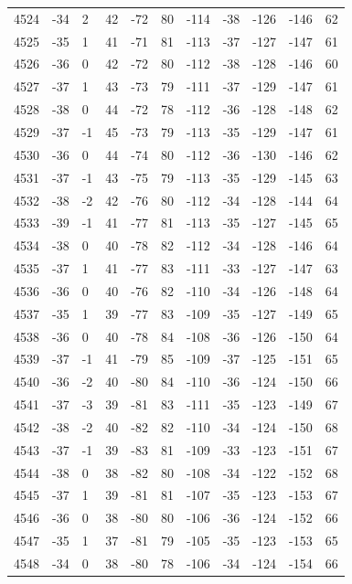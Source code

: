 \begin{table}[H]
\begin{tabular}{lllllllllll}
4524 & -34 & 2 & 42 & -72 & 80 & -114 & -38 & -126 & -146 & 62 \\
4525 & -35 & 1 & 41 & -71 & 81 & -113 & -37 & -127 & -147 & 61 \\
4526 & -36 & 0 & 42 & -72 & 80 & -112 & -38 & -128 & -146 & 60 \\
4527 & -37 & 1 & 43 & -73 & 79 & -111 & -37 & -129 & -147 & 61 \\
4528 & -38 & 0 & 44 & -72 & 78 & -112 & -36 & -128 & -148 & 62 \\
4529 & -37 & -1 & 45 & -73 & 79 & -113 & -35 & -129 & -147 & 61 \\
4530 & -36 & 0 & 44 & -74 & 80 & -112 & -36 & -130 & -146 & 62 \\
4531 & -37 & -1 & 43 & -75 & 79 & -113 & -35 & -129 & -145 & 63 \\
4532 & -38 & -2 & 42 & -76 & 80 & -112 & -34 & -128 & -144 & 64 \\
4533 & -39 & -1 & 41 & -77 & 81 & -113 & -35 & -127 & -145 & 65 \\
4534 & -38 & 0 & 40 & -78 & 82 & -112 & -34 & -128 & -146 & 64 \\
4535 & -37 & 1 & 41 & -77 & 83 & -111 & -33 & -127 & -147 & 63 \\
4536 & -36 & 0 & 40 & -76 & 82 & -110 & -34 & -126 & -148 & 64 \\
4537 & -35 & 1 & 39 & -77 & 83 & -109 & -35 & -127 & -149 & 65 \\
4538 & -36 & 0 & 40 & -78 & 84 & -108 & -36 & -126 & -150 & 64 \\
4539 & -37 & -1 & 41 & -79 & 85 & -109 & -37 & -125 & -151 & 65 \\
4540 & -36 & -2 & 40 & -80 & 84 & -110 & -36 & -124 & -150 & 66 \\
4541 & -37 & -3 & 39 & -81 & 83 & -111 & -35 & -123 & -149 & 67 \\
4542 & -38 & -2 & 40 & -82 & 82 & -110 & -34 & -124 & -150 & 68 \\
4543 & -37 & -1 & 39 & -83 & 81 & -109 & -33 & -123 & -151 & 67 \\
4544 & -38 & 0 & 38 & -82 & 80 & -108 & -34 & -122 & -152 & 68 \\
4545 & -37 & 1 & 39 & -81 & 81 & -107 & -35 & -123 & -153 & 67 \\
4546 & -36 & 0 & 38 & -80 & 80 & -106 & -36 & -124 & -152 & 66 \\
4547 & -35 & 1 & 37 & -81 & 79 & -105 & -35 & -123 & -153 & 65 \\
4548 & -34 & 0 & 38 & -80 & 78 & -106 & -34 & -124 & -154 & 66 \\

\end{tabular}
\end{table}
